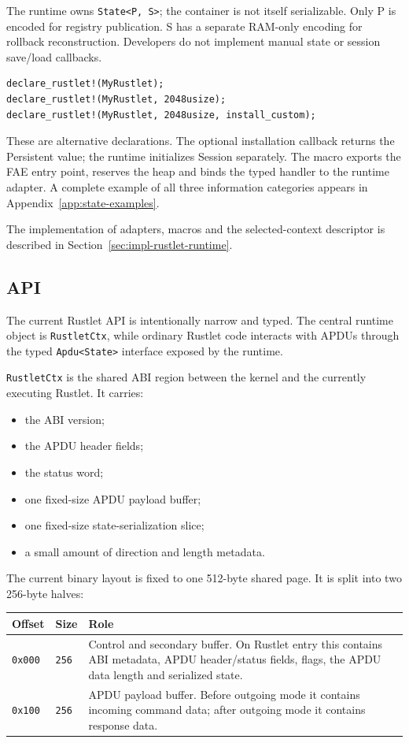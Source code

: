 The runtime owns \texttt{State<P, S>}; the container is not itself
serializable. Only P is encoded for registry publication. S has a separate
RAM-only encoding for rollback reconstruction. Developers do not implement
manual state or session save/load callbacks.

\begin{verbatim}
declare_rustlet!(MyRustlet);
declare_rustlet!(MyRustlet, 2048usize);
declare_rustlet!(MyRustlet, 2048usize, install_custom);
\end{verbatim}

These are alternative declarations. The optional installation callback
returns the Persistent value; the runtime initializes Session separately.
The macro exports the FAE entry point, reserves the heap and binds the typed
handler to the runtime adapter. A complete example of all three information
categories appears in Appendix~\ref{app:state-examples}.

The implementation of adapters, macros and the selected-context descriptor
is described in Section~\ref{sec:impl-rustlet-runtime}.

\subsection{API}

The current Rustlet API is intentionally narrow and typed. The central runtime
object is \texttt{RustletCtx}, while ordinary Rustlet code interacts with
APDUs through the typed \texttt{Apdu<State>} interface exposed by the
runtime.

\texttt{RustletCtx} is the shared ABI region between the kernel and the
currently executing Rustlet. It carries:
\begin{itemize}
\item the ABI version;
\item the APDU header fields;
\item the status word;
\item one fixed-size APDU payload buffer;
\item one fixed-size state-serialization slice;
\item a small amount of direction and length metadata.
\end{itemize}

The current binary layout is fixed to one 512-byte shared page. It is split
into two 256-byte halves:

\begin{center}
\begin{tabular}{|l|l|p{7.0cm}|}
\hline
\textbf{Offset} & \textbf{Size} & \textbf{Role} \\
\hline
\texttt{0x000} & \texttt{256} &
Control and secondary buffer. On Rustlet entry this contains ABI metadata,
APDU header/status fields, flags, the APDU data length and serialized state. \\
\hline
\texttt{0x100} & \texttt{256} &
APDU payload buffer. Before outgoing mode it contains incoming command data;
after outgoing mode it contains response data. \\
\hline
\end{tabular}
\end{center}

